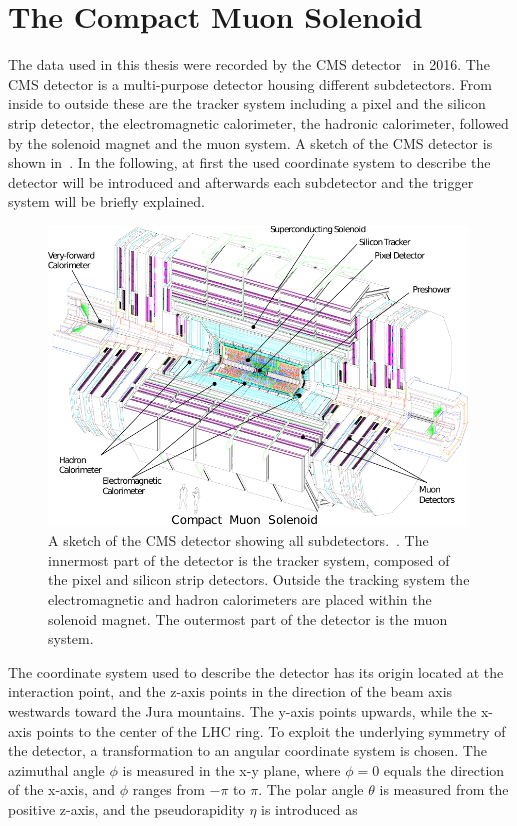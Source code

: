 \section{The Compact Muon Solenoid}\label{sec:CMS}
The data used in this thesis were recorded by the CMS detector~\cite{CMS,CMSTDR} in 2016. The CMS detector is a multi-purpose detector housing different subdetectors. From inside to outside these are the tracker system including a pixel and the silicon strip detector, the electromagnetic calorimeter, the hadronic calorimeter, followed by the solenoid magnet and the muon system. A sketch of the CMS detector is shown in~. In the following, at first the used coordinate system to describe the detector will be introduced and afterwards each subdetector and the trigger system will be briefly explained.
\begin{figure}[tbp]
 \centering
 \includegraphics[width=0.99\textwidth]{figures/general/cms}
 \caption{A sketch of the CMS detector showing all subdetectors.~\cite{CMSTDR}. The innermost part of the detector is the tracker system, composed of the pixel and silicon strip detectors. Outside the tracking system the electromagnetic and hadron calorimeters are placed within the solenoid magnet. The outermost part of the detector is the muon system.}
 \label{fig:CMS}
\end{figure}
The coordinate system used to describe the detector has its origin located at the interaction point, and the z-axis points in the direction of the beam axis westwards toward the Jura mountains. The y-axis points upwards, while the x-axis points to the center of the LHC ring. To exploit the underlying symmetry of the detector, a transformation to an angular coordinate system is chosen. The azimuthal angle $\phi$ is measured in the x-y plane, where $\phi=0$ equals the direction of the x-axis, and $\phi$ ranges from $-\pi$ to $\pi$. The polar angle $\theta$ is measured from the positive z-axis, and the pseudorapidity $\eta$ is introduced as
